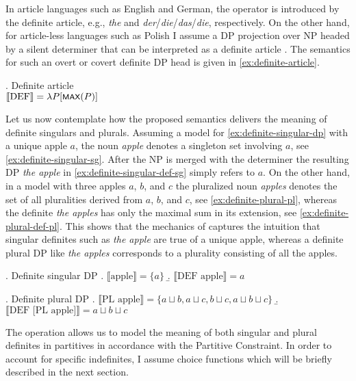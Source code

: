 	In article languages such as English and German, the  operator is introduced by the definite article, e.g., \textit{the} and \textit{der}/\textit{die}/\textit{das}/\textit{die}, respectively. On the other hand, for article-less languages such as Polish I assume a DP projection over NP headed by a silent determiner that can be interpreted as a definite article \citep[e.g.,][]{veselovska1995phrasal,progovac1998determiner,rutkowski2002noun}. The semantics for such an overt or covert definite DP head is given in \ref{ex:definite-article}.
	
	\ex. Definite article\\
	$\llbracket \text{DEF}\rrbracket = \lambda P[\cnst{max}(P)]$\label{ex:definite-article}
	
	Let us now contemplate how the proposed semantics delivers the meaning of definite singulars and plurals. Assuming a model for \ref{ex:definite-singular-dp} with a unique apple $a$, the noun \textit{apple} denotes a singleton set involving $a$, see \ref{ex:definite-singular-sg}. After the NP is merged with the determiner the resulting DP \textit{the apple} in \ref{ex:definite-singular-def-sg} simply refers to $a$. On the other hand, in a model with three apples $a$, $b$, and $c$ the pluralized noun \textit{apples} denotes the set of all pluralities derived from $a$, $b$, and $c$, see \ref{ex:definite-plural-pl}, whereas the definite \textit{the apples} has only the maximal sum in its extension, see \ref{ex:definite-plural-def-pl}. This shows that the mechanics of  captures the intuition that singular definites such as \textit{the apple} are true of a unique apple, whereas a definite plural DP like \textit{the apples} corresponds to a plurality consisting of all the apples.
	
	\ex. Definite singular DP\label{ex:definite-singular-dp}
	\a. $\llbracket \text{apple}\rrbracket = \{a\}$\label{ex:definite-singular-sg}
	\b. $\llbracket \text{DEF apple}\rrbracket = a$\label{ex:definite-singular-def-sg}

	\ex. Definite plural DP\label{ex:definite-plural-dp}
	\a. $\llbracket \text{PL apple}\rrbracket = \{a\sqcup b, a\sqcup c, b\sqcup c, a\sqcup b\sqcup c\}$\label{ex:definite-plural-pl}
	\b. $\llbracket \text{DEF [PL apple]}\rrbracket = a\sqcup b\sqcup c$\label{ex:definite-plural-def-pl}
	
	The  operation allows us to model the meaning of both singular and plural definites in partitives in accordance with the Partitive Constraint. In order to account for specific indefinites, I assume choice functions which will be briefly described in the next section.
	
